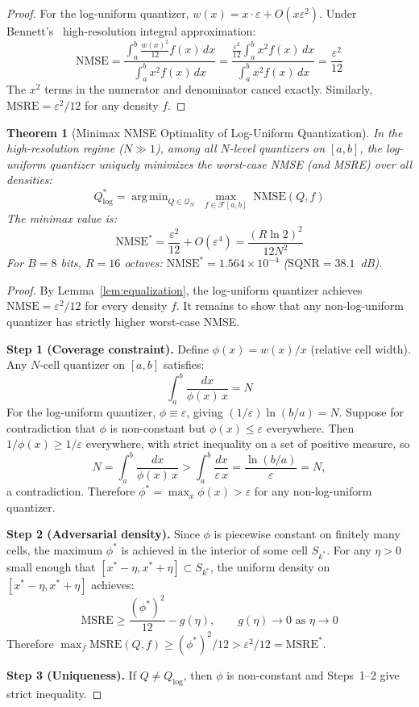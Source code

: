 \documentclass[11pt,letterpaper]{article}
\newtheorem{theorem}{Theorem}[section]
\theoremstyle{definition}
\theoremstyle{remark}
\newcommand{\NMSE}{\mathrm{NMSE}}
\newcommand{\MSRE}{\mathrm{MSRE}}
\newcommand{\SQNR}{\mathrm{SQNR}}
\DeclareMathOperator*{\argmin}{arg\,min}
\begin{document}
\begin{proof}
For the log-uniform quantizer, $w(x) = x \cdot \varepsilon + O(x\varepsilon^2)$.
Under Bennett's~\cite{bennett1948} high-resolution integral approximation:
\[
  \NMSE = \frac{\int_a^b \frac{w(x)^2}{12} f(x)\,dx}{\int_a^b x^2 f(x)\,dx}
  = \frac{\frac{\varepsilon^2}{12}\int_a^b x^2 f(x)\,dx}
         {\int_a^b x^2 f(x)\,dx}
  = \frac{\varepsilon^2}{12}
\]
The $x^2$ terms in the numerator and denominator cancel exactly.
Similarly, $\MSRE = \varepsilon^2/12$ for any density $f$.
\end{proof}

\begin{theorem}[Minimax NMSE Optimality of Log-Uniform Quantization]
\label{thm:minimax}
In the high-resolution regime ($N \gg 1$), among all $N$-level quantizers on
$[a,b]$, the log-uniform quantizer uniquely minimizes the worst-case NMSE
(and MSRE) over all densities:
\[
  Q^*_{\log} = \argmin_{Q \in \mathcal{Q}_N}\; \max_{f \in \mathcal{F}[a,b]}\;
  \NMSE(Q, f)
\]
The minimax value is:
\begin{equation}
  \boxed{\NMSE^* = \frac{\varepsilon^2}{12} + O(\varepsilon^4)
  = \frac{(R \ln 2)^2}{12 N^2}}
  \label{eq:minimax-nmse}
\end{equation}
For $B = 8$ bits, $R = 16$ octaves:
$\NMSE^* = 1.564 \times 10^{-4}$ ($\SQNR = 38.1$~dB).
\end{theorem}

\begin{proof}
By Lemma~\ref{lem:equalization}, the log-uniform quantizer achieves
$\NMSE = \varepsilon^2/12$ for every density $f$.
It remains to show that any non-log-uniform quantizer has strictly higher
worst-case NMSE.

\textbf{Step 1 (Coverage constraint).}
Define $\phi(x) = w(x)/x$ (relative cell width).
Any $N$-cell quantizer on $[a,b]$ satisfies:
\begin{equation}
  \int_a^b \frac{dx}{\phi(x)\,x} = N
  \label{eq:coverage}
\end{equation}
For the log-uniform quantizer, $\phi \equiv \varepsilon$, giving
$(1/\varepsilon)\ln(b/a) = N$.
Suppose for contradiction that $\phi$ is non-constant but
$\phi(x) \le \varepsilon$ everywhere.
Then $1/\phi(x) \ge 1/\varepsilon$ everywhere, with strict inequality on a set
of positive measure, so
\[
  N = \int_a^b \frac{dx}{\phi(x)\,x}
  > \int_a^b \frac{dx}{\varepsilon\,x}
  = \frac{\ln(b/a)}{\varepsilon} = N,
\]
a contradiction.
Therefore $\phi^* = \max_x \phi(x) > \varepsilon$ for any non-log-uniform
quantizer.

\textbf{Step 2 (Adversarial density).}
Since $\phi$ is piecewise constant on finitely many cells, the maximum
$\phi^*$ is achieved in the interior of some cell $S_{k^*}$.
For any $\eta > 0$ small enough that
$[x^* - \eta, x^* + \eta] \subset S_{k^*}$,
the uniform density on $[x^* - \eta, x^* + \eta]$ achieves:
\[
  \MSRE \geq \frac{(\phi^*)^2}{12} - g(\eta),
  \qquad g(\eta) \to 0 \text{ as } \eta \to 0
\]
Therefore
$\max_f \MSRE(Q, f) \geq (\phi^*)^2/12 > \varepsilon^2/12 = \MSRE^*$.

\textbf{Step 3 (Uniqueness).}
If $Q \neq Q_{\log}$, then $\phi$ is non-constant and Steps~1--2 give strict
inequality.
\end{proof}
\end{document}
